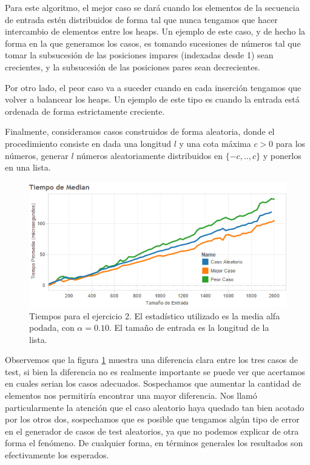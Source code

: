 \documentclass{article}
\theoremstyle{definition}
\theoremstyle{remark}
\begin{document}
Para este algoritmo, el mejor caso se dará cuando los elementos de la secuencia de entrada estén distribuidos de forma tal que nunca tengamos que hacer intercambio de elementos entre los heaps. Un ejemplo de este caso, y de hecho la forma en la que generamos los casos, es tomando sucesiones de números tal que tomar la subsucesión de las posiciones impares (indexadas desde 1) sean crecientes, y la subsucesión de las posiciones pares sean decrecientes.

Por otro lado, el peor caso va a suceder cuando en cada inserción tengamos que volver a balancear los heaps. Un ejemplo de este tipo es cuando la entrada está ordenada de forma estrictamente creciente.

Finalmente, consideramos casos construidos de forma aleatoria, donde el procedimiento consiste en dada una longitud $l$ y una cota máxima $c > 0$ para los números, generar $l$ números aleatoriamente distribuidos en $\{-c, .., c\}$ y ponerlos en una lista.

\begin{figure}[h!]
\centering
\includegraphics[width=15cm]{images/ex2-best-worst}
\caption{Tiempos para el ejercicio 2. El estadístico utilizado es la media alfa podada, con $\alpha = 0.10$. El tamaño de entrada es la longitud de la lista. \label{grf:ex2-best-worst}}
\end{figure}

Observemos que la figura \ref{grf:ex2-best-worst} muestra una diferencia clara entre los tres casos de test, si bien la diferencia no es realmente importante se puede ver que acertamos en cuales serian los casos adecuados. Sospechamos que aumentar la cantidad de elementos nos permitiría encontrar una mayor diferencia. Nos llamó particularmente la atención que el caso aleatorio haya quedado tan bien acotado por los otros dos, sospechamos que es posible que tengamos algún tipo de error en el generador de casos de test aleatorios, ya que no podemos explicar de otra forma el fenómeno. De cualquier forma, en términos generales los resultados son efectivamente los esperados.
\end{document}
